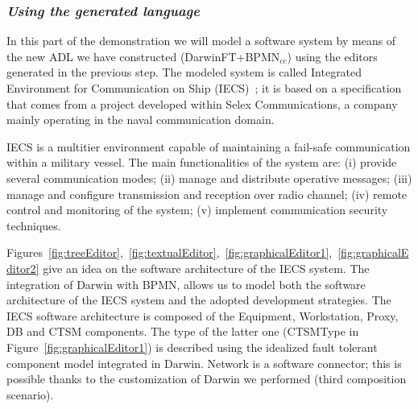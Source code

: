 \subsubsection{\em Using the generated language}
In this part of the demonstration we will model a software system
by means of the new ADL we have constructed (DarwinFT+BPMN$_{cc}$)
using the editors generated in the previous step.
The modeled system is called Integrated Environment for Communication on Ship
(IECS)~\cite{duallyTSE}; it is based on a specification that comes from
a project developed within Selex Communications, a company mainly
operating in the naval communication domain.

IECS is a multitier environment capable of maintaining a fail-safe
communication within a military vessel. The main functionalities of
the system are: (i) provide several communication modes; (ii) manage
and distribute operative messages; (iii) manage and configure
transmission and reception over radio channel; (iv) remote control
and monitoring of the system; (v) implement communication security
techniques.

Figures~\ref{fig:treeEditor},~\ref{fig:textualEditor},~\ref{fig:graphicalEditor1},~\ref{fig:graphicalEditor2}
give an idea on the software architecture of the IECS system.
The integration of Darwin with BPMN, allows us to model both
the software architecture of the IECS system and the adopted
development strategies. The IECS software architecture is composed
of the Equipment, Workstation, Proxy, DB and CTSM components. The
type of the latter one (CTSMType in Figure~\ref{fig:graphicalEditor1}) is described using the
idealized fault tolerant component model integrated in Darwin.
Network is a software connector; this is possible thanks to the
customization of Darwin we performed (third composition scenario).

